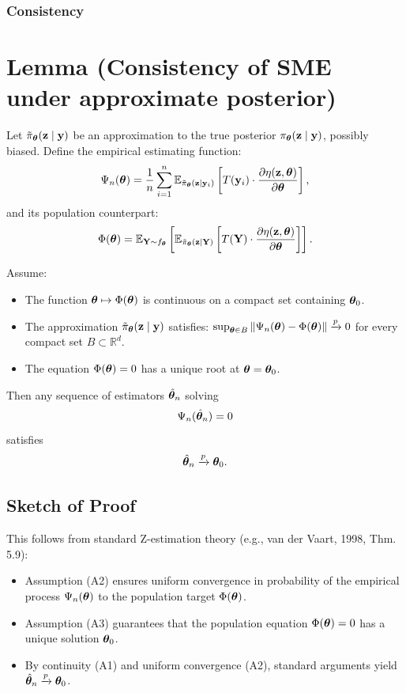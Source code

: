 \documentclass[twoside,11pt]{article}
\begin{document}
\subsubsection{Consistency}

\section*{Lemma (Consistency of SME under approximate posterior)}

Let \( \tilde{\pi}_{\bm{\theta}}({\bf z} \mid {\bf y}) \) be an approximation to the true posterior \( \pi_{\bm{\theta}}({\bf z} \mid {\bf y}) \), possibly biased. Define the empirical estimating function:
\begin{equation}
\label{eq:SME-estimating-equation}
\Psi_n({\bm{\theta}}) 
= \frac{1}{n} \sum_{i=1}^n 
\mathbb{E}_{\tilde\pi_{\bm{\theta}}({\bf z} \mid {\bf y}_i)} 
\left[
T({\bf y}_i) \cdot 
\frac{\partial \eta({\bf z}, {\bm{\theta}})}{\partial {\bm{\theta}}}
\right],
\end{equation}
and its population counterpart:
\begin{equation}
\label{eq:SME-population-target}
\Phi({\bm{\theta}})
= \mathbb{E}_{{\bf Y} \sim f_{\bm{\theta}}}
\left[
\mathbb{E}_{\tilde\pi_{\bm{\theta}}({\bf z} \mid {\bf Y})} 
\left[
T({\bf Y}) \cdot 
\frac{\partial \eta({\bf z}, {\bm{\theta}})}{\partial {\bm{\theta}}}
\right]
\right].
\end{equation}

Assume:
\begin{itemize}
    \item[(A1)] The function \( {\bm{\theta}} \mapsto \Phi({\bm{\theta}}) \) is continuous on a compact set containing \( {\bm{\theta}}_0 \).
    \item[(A2)] The approximation \( \tilde{\pi}_{\bm{\theta}}({\bf z} \mid {\bf y}) \) satisfies: \( \sup_{{\bm{\theta}} \in B} \| \Psi_n({\bm{\theta}}) - \Phi({\bm{\theta}}) \| \xrightarrow{p} 0 \) for every compact set \( B \subset \mathbb{R}^d \).
    \item[(A3)] The equation \( \Phi({\bm{\theta}}) = 0 \) has a unique root at \( {\bm{\theta}} = {\bm{\theta}}_0 \).
\end{itemize}

Then any sequence of estimators \( \hat{{\bm{\theta}}}_n \) solving
\[
\Psi_n(\hat{{\bm{\theta}}}_n) = 0
\]
satisfies
\[
\hat{{\bm{\theta}}}_n \xrightarrow{p} {\bm{\theta}}_0.
\]

\subsection*{Sketch of Proof}

This follows from standard Z-estimation theory (e.g., van der Vaart, 1998, Thm. 5.9):

\begin{itemize}
    \item Assumption (A2) ensures uniform convergence in probability of the empirical process \( \Psi_n({\bm{\theta}}) \) to the population target \( \Phi({\bm{\theta}}) \).
    \item Assumption (A3) guarantees that the population equation \( \Phi({\bm{\theta}}) = 0 \) has a unique solution \( {\bm{\theta}}_0 \).
    \item By continuity (A1) and uniform convergence (A2), standard arguments yield \( \hat{{\bm{\theta}}}_n \xrightarrow{p} {\bm{\theta}}_0 \).
\end{itemize}
\end{document}
